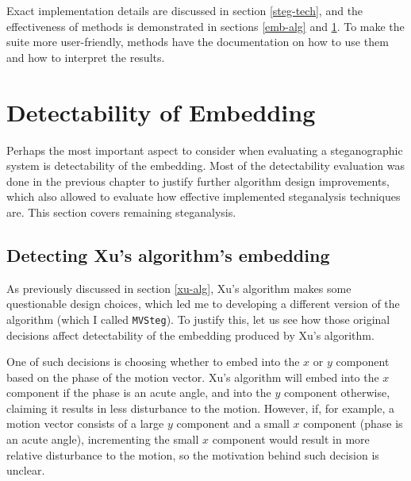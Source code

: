 \documentclass[12pt,british,twoside,notitlepage,usenames,dvipsnames,hypens,final]{report}
\numberwithin{equation}{section}
\numberwithin{figure}{section}
\begin{document}
Exact implementation details are discussed in section \ref{steg-tech}, and the effectiveness of methods is demonstrated in sections \ref{emb-alg} and \ref{rem-detect-eval}. To make the suite more user-friendly, methods have the documentation on how to use them and how to interpret the results. 

\section{Detectability of Embedding}
\label{rem-detect-eval}

Perhaps the most important aspect to consider when evaluating a steganographic system is detectability of the embedding. Most of the detectability evaluation was done in the previous chapter to justify further algorithm design improvements, which also allowed to evaluate how effective implemented steganalysis techniques are. This section covers remaining steganalysis.

\subsection{Detecting Xu's algorithm's embedding}
\label{breaking-xu}

As previously discussed in section \ref{xu-alg}, Xu's algorithm makes some questionable design choices, which led me to developing a different version of the algorithm (which I called \texttt{MVSteg}). To justify this, let us see how those original decisions affect detectability of the embedding produced by Xu's algorithm.

One of such decisions is choosing whether to embed into the $x$ or $y$ component based on the phase of the motion vector. Xu's algorithm will embed into the $x$ component if the phase is an acute angle, and into the $y$ component otherwise, claiming it results in less disturbance to the motion. However, if, for example, a motion vector consists of a large $y$ component and a small $x$ component (phase is an acute angle), incrementing the small $x$ component would result in more relative disturbance to the motion, so the motivation behind such decision is unclear.
\end{document}

